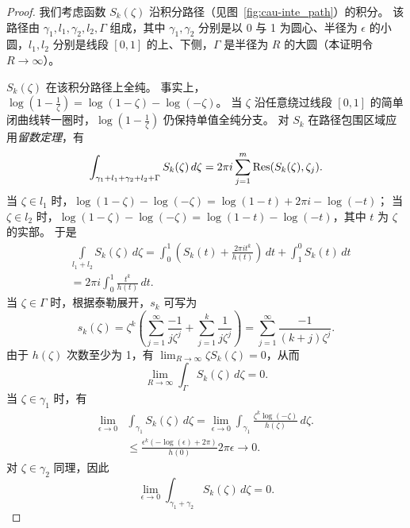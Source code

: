 \begin{proof}
我们考虑函数 \(S_k(\zeta)\) 沿积分路径（见图~\ref{fig:cau-inte_path}）的积分。
该路径由 \(\gamma_1,l_1,\gamma_2,l_2,\Gamma\) 组成，其中 \(\gamma_1,\gamma_2\) 分别是以 0 与 1 为圆心、半径为 \(\epsilon\) 的小圆，\(l_1,l_2\) 分别是线段 \([0,1]\) 的上、下侧，\(\Gamma\) 是半径为 \(R\) 的大圆（本证明令 \(R \to \infty\)）。

\(S_k(\zeta)\) 在该积分路径上全纯。
事实上，\(\log\left(1 - \frac{1}{\zeta}\right) = \log(1-\zeta) - \log(-\zeta)\)。
当 \(\zeta\) 沿任意绕过线段 \([0,1]\) 的简单闭曲线转一圈时，$\log\left(1 - \frac{1}{\zeta}\right)$ 仍保持单值全纯分支。
%
对 $S_k$ 在路径包围区域应用\emph{留数定理}，有
    \begin{equation}\label{equ:cau-residue_theorem}
        \begin{aligned}
 \int_{\gamma_1+l_1+\gamma_2+l_2+\Gamma} S_k(\zeta) \, d\zeta
            = 2\pi i \sum_{j=1}^{m} \mathop{\mathrm{Res}}(S_k(\zeta), \zeta_j).
        \end{aligned}
    \end{equation}
当 $\zeta\in l_1$ 时，$\log(1-\zeta)-\log(-\zeta)=\log(1-t)+2 \pi i-\log(-t)$；
当 $\zeta\in l_2$ 时，$\log(1-\zeta)-\log(-\zeta)=\log(1-t)-\log(-t)$，其中 $t$ 为 $\zeta$ 的实部。
于是
\begin{equation}\label{equ:cau-l1l2}
\begin{aligned}
    &\int\limits_{l_1+l_2} S_k(\zeta) \, d\zeta=\int_{0}^1 \left(S_k(t) +\frac{2\pi i t^k}{h(t)}\right)\, dt+\int_1^0 S_k(t) \, dt\\
    &=2\pi i \int_{0}^{1} \frac{ t^k}{h(t)} \, dt.
    \end{aligned}
\end{equation}
 当 \( \zeta \in \Gamma \) 时，根据泰勒展开，\( s_k \) 可写为
    \begin{equation}
        s_k(\zeta)=\zeta^k(\sum_{j=1}^{\infty}\frac{-1}{j \zeta^j}+\sum_{j=1}^k\frac{1}{j \zeta^j})=\sum_{j=1}^\infty\frac{-1}{(k+j) \zeta^{j}}.
    \end{equation}
    由于 $h(\zeta)$ 次数至少为 1，有 $\lim_{R\to \infty}\zeta S_k(\zeta)=0$，从而
    \begin{equation}\label{equ:cau-Gamma}
        \lim\limits_{R\to \infty}\int_{\Gamma} S_k(\zeta) \, d\zeta=0.
    \end{equation}
    当 $\zeta \in \gamma_1$ 时，有
    \begin{equation}
    \begin{aligned}
       \lim\limits_{\epsilon\to 0} &\int_{\gamma_1} S_k(\zeta) \, d\zeta=\lim\limits_{\epsilon\to 0}\int_{\gamma_1} \frac{\zeta^k \log(-\zeta)}{h(\zeta)}\, d\zeta.\\
       &\leq \frac{\epsilon^k (-\log(\epsilon)+2 \pi)}{h(0)}2 \pi \epsilon \to 0.
       \end{aligned}
    \end{equation}
    对 $\zeta \in \gamma_2$ 同理，因此
    \begin{equation}\label{equ:cau-gamma12}
       \lim\limits_{\epsilon\to 0} \int_{\gamma_1+\gamma_2} S_k(\zeta) \, d\zeta=0.
    \end{equation}


\end{proof}
